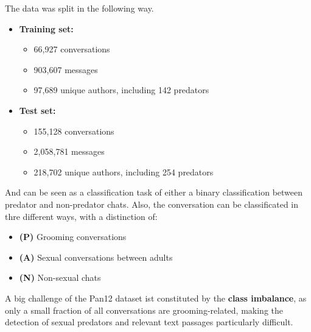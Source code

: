 The data was split in the following way.

\begin{itemize}
    \item \textbf{Training set:}
    \begin{itemize}
        \item 66{,}927 conversations
        \item 903{,}607 messages
        \item 97{,}689 unique authors, including 142 predators
    \end{itemize}
    \item \textbf{Test set:}
    \begin{itemize}
        \item 155{,}128 conversations
        \item 2{,}058{,}781 messages
        \item 218{,}702 unique authors, including 254 predators
    \end{itemize}
\end{itemize}

And can be seen as a classification task of either a binary classification between predator and non-predator chats. Also, the conversation can be classificated in thre different ways, with a distinction of:

\begin{itemize}
    \item \textbf{(P)} Grooming conversations
    \item \textbf{(A)} Sexual conversations between adults
    \item \textbf{(N)} Non-sexual chats
\end{itemize}

A big challenge of the Pan12 dataset ist constituted by the \textbf{class imbalance}, as only a small fraction of all conversations are grooming-related, making the detection of sexual predators and relevant text passages particularly difficult.


